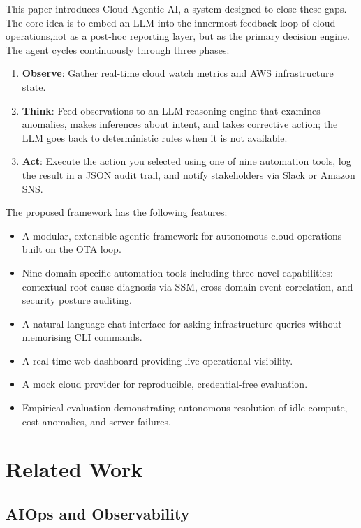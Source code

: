 \documentclass{ieeeaccess}
\begin{document}
This paper introduces Cloud Agentic AI, a system designed to close these gaps. The core idea is to embed an LLM into the innermost feedback loop of cloud operations,not as a post-hoc reporting layer, but as the primary decision engine. The agent cycles continuously through three phases:

\begin{enumerate}
  \item \textbf{Observe}: Gather real-time cloud watch metrics and AWS infrastructure state.
  \item \textbf{Think}: Feed observations to an LLM reasoning engine that examines anomalies, makes inferences about intent, and takes corrective action; the LLM goes back to deterministic rules when it is not available.
  \item \textbf{Act}: Execute the action you selected using one of nine automation tools, log the result in a JSON audit trail, and notify stakeholders via Slack or Amazon SNS.
\end{enumerate}

The proposed framework has the following features:
\begin{itemize}
  \item A modular, extensible agentic framework for autonomous cloud operations built on the OTA loop.
  \item Nine domain-specific automation tools including three novel
        capabilities: contextual root-cause diagnosis via SSM, cross-domain
        event correlation, and security posture auditing.
  \item A natural language chat interface for asking     infrastructure queries without memorising CLI commands.
  \item A real-time web dashboard providing live operational visibility.
  \item A mock cloud provider for reproducible, credential-free evaluation.
  \item Empirical evaluation demonstrating autonomous resolution of idle
        compute, cost anomalies, and server failures.
\end{itemize}

\section{Related Work}
\label{sec:related}

\subsection{AIOps and Observability}
\end{document}
